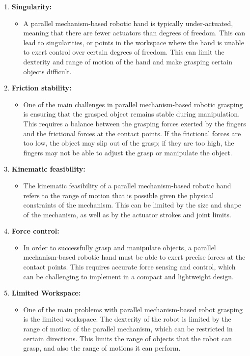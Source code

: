 \documentclass[12pt, twoside]{report}
\begin{document}
\begin{enumerate}
    \item \textbf{Singularity: }
    \begin{itemize}
        \item A parallel mechanism-based robotic hand is typically under-actuated, meaning that there are fewer actuators than degrees of freedom. This can lead to singularities, or points in the workspace where the hand is unable to exert control over certain degrees of freedom. This can limit the dexterity and range of motion of the hand and make grasping certain objects difficult.
    \end{itemize}

    \item\textbf{Friction stability:}
    \begin{itemize}
        \item One of the main challenges in parallel mechanism-based robotic grasping is ensuring that the grasped object remains stable during manipulation. This requires a balance between the grasping forces exerted by the fingers and the frictional forces at the contact points. If the frictional forces are too low, the object may slip out of the grasp; if they are too high, the fingers may not be able to adjust the grasp or manipulate the object.
    \end{itemize}

    \item \textbf{Kinematic feasibility:}
    \begin{itemize}
        \item The kinematic feasibility of a parallel mechanism-based robotic hand refers to the range of motion that is possible given the physical constraints of the mechanism. This can be limited by the size and shape of the mechanism, as well as by the actuator strokes and joint limits.
    \end{itemize}

    \item \textbf{Force control:}
    \begin{itemize}
        \item In order to successfully grasp and manipulate objects, a parallel mechanism-based robotic hand must be able to exert precise forces at the contact points. This requires accurate force sensing and control, which can be challenging to implement in a compact and lightweight design.
    \end{itemize}

    \item \textbf{Limited Workspace:}
    \begin{itemize}
        \item One of the main problems with parallel mechanism-based robot grasping is the limited workspace. The dexterity of the robot is limited by the range of motion of the parallel mechanism, which can be restricted in certain directions. This limits the range of objects that the robot can grasp, and also the range of motions it can perform.
    \end{itemize} 
    

\end{enumerate}
\end{document}
